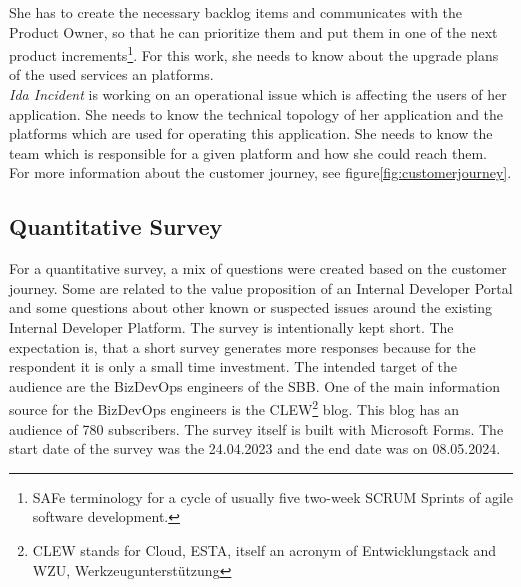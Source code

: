 \documentclass[a4paper,12pt]{article}
\begin{document}
    She has to create the necessary backlog items and communicates with the Product Owner, so that he can prioritize
    them and put them in one of the next product increments\footnote{SAFe terminology for a cycle of usually five two-week SCRUM Sprints of agile software development.}.
    For this work, she needs to know about the upgrade plans of the used services an platforms.     \\
    \textit{Ida Incident} is working on an operational issue which is affecting the users of her application.
    She needs to know the technical topology of her application and the platforms which are used for operating this application.
    She needs to know the team which is responsible for a given platform and how she could reach them.\\
    For more information about the customer journey, see figure\ref{fig:customerjourney}.

    \subsection{Quantitative Survey}
    \label{subsec:quansur}
    For a quantitative survey, a mix of questions were created based on the customer journey.
    Some are related to the value proposition of an Internal Developer Portal and some questions about other known or
    suspected issues around the existing Internal Developer Platform.
    The survey is intentionally kept short.
    The expectation is, that a short survey generates more responses because for the respondent it is only a small time investment.
    The intended target of the audience are the BizDevOps engineers of the SBB.
    One of the main information source for the BizDevOps engineers is the CLEW\footnote{CLEW stands for Cloud, ESTA,
        itself an acronym of Entwicklungstack and WZU, Werkzeugunterstützung} blog.
    This blog has an audience of 780 subscribers.
    The survey itself is built with Microsoft Forms.
    The start date of the survey was the 24.04.2023 and the end date was on 08.05.2024.
\end{document}
